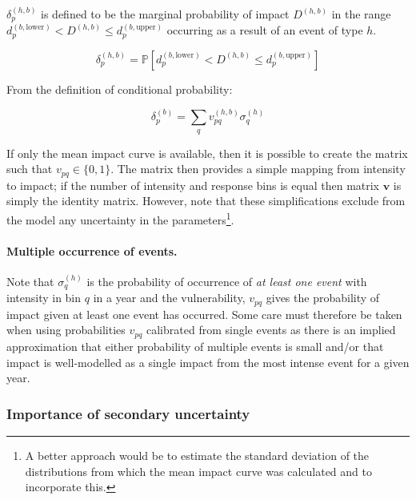 \documentclass[a4paper,11pt]{extarticle} %
\theoremstyle{definition}
\begin{document}
$\delta^{(h,b)}_p$ is defined to be the marginal probability of impact $D^{(h, b)}$ in the range $d^{(b, \text{lower})}_p < D^{(h, b)} \le d^{(b,\text{upper})}_p$ occurring as a result of an event of type $h$.

\begin{equation}
    \label{Eq:impact}
    \delta^{(h, b)}_p =  \mathbb{P} \left[ d^{(b,\text{lower})}_p < D^{(h, b)} \le d^{(b,\text{upper})}_p \right]
\end{equation}

From the definition of conditional probability:

\begin{equation}
    \label{Eq:model}
    \delta^{(b)}_p = \sum_{q} v^{(h,b)}_{pq} \sigma^{(h)}_q
\end{equation}

If only the mean impact curve is available, then it is possible to create the matrix such that $v_{pq} \in \{0, 1\}$. The matrix then provides a simple mapping from intensity to impact; if the number of intensity and response bins is equal then matrix $\mathbf{v}$ is simply the identity matrix. However, note that these simplifications exclude from the model any uncertainty in the parameters\footnote{A better approach would be to estimate the standard deviation of the distributions from which the mean impact curve was calculated and to incorporate this.}.

\paragraph{Multiple occurrence of events.} Note that $\sigma^{(h)}_q$ is the probability of occurrence of \emph{at least one event} with intensity in bin $q$ in a year and the vulnerability, $v_{pq}$ gives the probability of impact given at least one event has occurred. Some care must therefore be taken when using probabilities $v_{pq}$ calibrated from single events as there is an implied approximation that either probability of multiple events is small and/or that impact is well-modelled as a single impact from the most intense event for a given year.


\subsubsection{Importance of secondary uncertainty}
\end{document}
